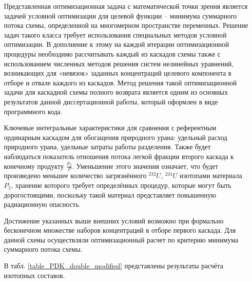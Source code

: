 Представленная оптимизационная задача с математической точки зрения является задачей условной оптимизации для целевой функции -- минимума суммарного потока схемы, определенной на многомерном пространстве переменных. Решение задач такого класса требует использования специальных методов условной оптимизации. В дополнение к этому на каждой итерации оптимизационной процедуры необходимо рассчитывать каждый из каскадов схемы также с использованием численных методов решения систем нелинейных уравнений, возникающих для «невязок» заданных концентраций целевого компонента в отборе и отвале каждого из каскадов. Метод решения такой оптимизационной задачи для каскадной схемы полного возврата является одним из основных результатов данной диссертационной работы, который оформлен в виде программного кода.
 
Ключевые интегральные характеристики для сравнения с референтным ординарным каскадом для обогащения природного урана: удельный расход природного урана, удельные затраты работы разделения. Также будет наблюдаться показатель отношения потока легкой фракции второго каскада к конечному продукту $\frac{P_2}{P}$. Уменьшение этого значения означает, что будет произведено меньшее количество загрязнённого $^{232}U$, $^{234}U$ изотопами материала $P_2$, хранение которого требует определённых процедур, которые могут быть дорогостоящими, поскольку такой материал представляет повышенную радиационную опасность.

Достижение указанных выше внешних условий возможно при формально бесконечном множестве наборов концентраций в отборе первого каскада. Для данной схемы осуществляли оптимизационный расчет по критерию минимума суммарного потока схемы. 

В табл. \ref{table_PDK_double_modified} представлены результаты расчёта изотопных составов.

